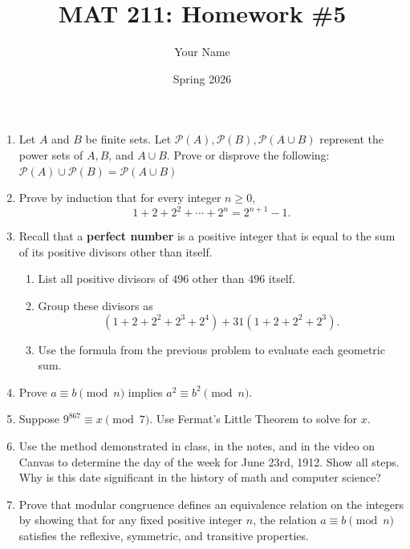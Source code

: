 \documentclass{article}
\title{MAT 211: Homework \#5}
\date{Spring 2026}
\author{Your Name}
\begin{document}
\maketitle 

\begin{enumerate}


\item Let $A$ and $B$ be finite sets.  Let \( \mathcal{P}(A), \mathcal{P}(B), \mathcal{P}(A\cup B)\) represent the power sets of $A,B$, and $A \cup B$. 
            Prove or disprove the following:\\ \( \mathcal{P}(A) \cup \mathcal{P}(B) = \mathcal{P}(A\cup B)\)
\item Prove by induction that for every integer $n \geq 0$,
\[
1+2+2^2+\cdots+2^n = 2^{n+1}-1.
\]

\item Recall that a \textbf{perfect number} is a positive integer that is equal to the sum of its positive divisors other than itself.

\begin{enumerate}
    
    \item List all positive divisors of $496$ other than $496$ itself.

    \item Group these divisors as
    \[
    (1+2+2^2+2^3+2^4) + 31(1+2+2^2+2^3).
    \]

    \item Use the formula from the previous problem to evaluate each geometric sum.

\end{enumerate}

    \item Prove $a\equiv b \pmod n$ implies $a^2 \equiv b^2 \pmod n$. 

    \item Suppose \( 9^{867} \equiv x \pmod{7}\).  Use Fermat's Little Theorem to solve for $x$. 
    \item Use the method demonstrated in class, in the notes, and in the video on Canvas to determine the day of the week for June 23rd, 1912.  Show all steps. Why is this date significant in the history of math and computer science?
    \item Prove that modular congruence defines an equivalence relation on the integers by showing that for any fixed positive integer $n$, the relation \(a \equiv b \pmod{n} \) satisfies the reflexive, symmetric, and transitive properties.
    

\end{enumerate}
\end{document}
